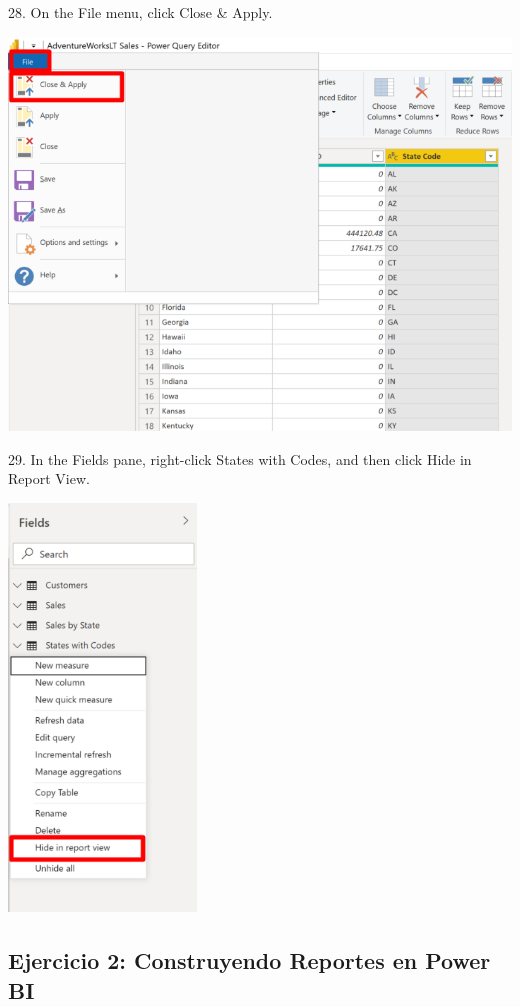 \documentclass[12pt,letterpaper]{article}
\begin{document}
28. On the File menu, click Close \& Apply.
\begin{center}
    \includegraphics[width=14cm]{img/69.png}  
\end{center}
29. In the Fields pane, right-click States with Codes, and then click Hide in Report View.
\begin{center}
    \includegraphics[width=5cm]{img/70.png}  
\end{center}

\subsection{Ejercicio 2: Construyendo Reportes en Power BI}
\end{document}
